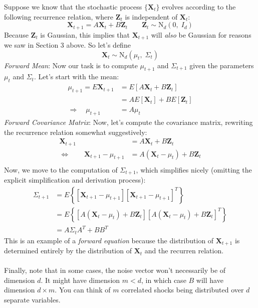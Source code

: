 \documentclass[a4paper,12pt]{scrartcl}
\begin{document}
Suppose we know that the stochastic process $\{\mathbf{X}_t\}$
evolves according to the following recurrence relation,
where $\mathbf{Z}_t$ is independent of $\mathbf{X}_t$: 
\begin{equation}
    \mathbf{X}_{t+1} = A \mathbf{X}_t + B \mathbf{Z}_t
    \qquad \mathbf{Z}_t \sim \text{N}_d(0, \; I_d) 
\end{equation}
Because $\mathbf{Z}_t$ is Gaussian, this implies that 
$\mathbf{X}_{t+1}$ will \emph{also} be Gaussian for reasons we saw  
in Section 3 above. So let's define
\begin{equation}
    \mathbf{X}_t \sim \text{N}_d(\mu_t, \; \Sigma_t)
\end{equation}
{\sl Forward Mean}: 
Now our task is to compute $\mu_{t+1}$ and $\Sigma_{t+1}$
given the parameters $\mu_t$ and $\Sigma_t$.  Let's start with the
mean:
\begin{align*}
    \mu_{t+1} = E\mathbf{X}_{t+1} &= E\left[A\mathbf{X}_t +
	B \mathbf{Z}_t\right] \\
    &= AE[\mathbf{X}_t] + BE[\mathbf{Z}_t] \\
    \Rightarrow \quad \mu_{t+1} &= A\mu_t
\end{align*}
{\sl Forward Covariance Matrix}:
Now, let's compute the covariance matrix, rewriting the recurrence 
relation somewhat suggestively:
\begin{align*}
    \mathbf{X}_{t+1} &= A \mathbf{X}_t + B \mathbf{Z}_t \\
    \Leftrightarrow \qquad 
	\mathbf{X}_{t+1} - \mu_{t+1} &= 
	A (\mathbf{X}_t - \mu_t) + B \mathbf{Z}_t \\
\end{align*}
Now, we move to the computation of $\Sigma_{t+1}$, which simplifies
nicely (omitting the explicit simplification and derivation process):
\begin{align*}
    \Sigma_{t+1} &= E\left\{ \left[\mathbf{X}_{t+1} - \mu_{t+1} \right]
    \left[\mathbf{X}_{t+1} - \mu_{t+1} \right]^T \right\} \\
    &= E\left\{ \left[A (\mathbf{X}_t - \mu_t) + B \mathbf{Z}_t\right]
	\left[A (\mathbf{X}_t - \mu_t) + B \mathbf{Z}_t\right]^T
	\right\} \\
    &= A\Sigma_t A^T + BB^T
\end{align*}
This is an example of a \emph{forward equation} because the 
distribution of $\mathbf{X}_{t+1}$ is determined entirely by 
the distribution of $\mathbf{X}_t$ and the recurren relation.
\\
\\
Finally, note that in some cases, the noise vector won't necessarily
be of dimension $d$.  It might have dimension $m<d$, in which 
case $B$ will have dimension $d\times m$. You can think of 
$m$ correlated shocks being distributed over $d$ separate variables.
\end{document}
